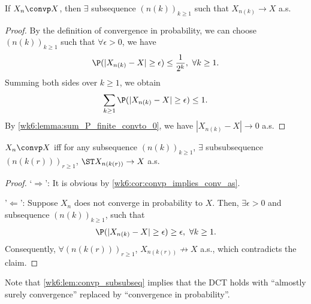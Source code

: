 \documentclass[../aipt.tex]{subfiles}
\begin{document}
%
\begin{Corollary} \label{wk6:cor:convp_implies_conv_as}
If $X_n \convp X$, then $\exists$ subsequence $(n(k))_{k\geq1}$ such that $X_{n(k)} \to X$ a.s.
\end{Corollary}
\begin{proof}
By the definition of convergence in probability, we can choose $(n(k))_{k\geq1}$ such that $\forall \epsilon > 0$, we have
\begin{align*}
\P(|X_{n(k)} - X| \geq \epsilon) \leq \frac{1}{2^k},\ \forall k \geq 1.
\end{align*}
Summing both sides over $k \geq 1$, we obtain
\begin{align*}
\sum_{k \geq 1} \P(|X_{n(k)} - X| \geq \epsilon) \leq 1.
\end{align*}
By \cref{wk6:lemma:sum_P_finite_convto_0}, we have $|X_{n(k)} - X| \to 0$ a.s.
\end{proof}
%
\begin{Lemma}\label{wk6:lem:convp_subsubseq}
$X_n \convp X$ iff for any subsequence $\left(n(k)\right)_{k \geq 1}$, $\exists$ subsubsequence $\left(n\left(k(r)\right)\right)_{r \geq 1}$, $\ST X_{n \left(k(r)\right)} \to X$ a.s.
\end{Lemma}
\begin{proof}
`$\Rightarrow$': It is obvious by \cref{wk6:cor:convp_implies_conv_as}. 

'$\Leftarrow$': Suppose $X_n$ does not converge in probability to $X$. Then, $\exists \epsilon > 0$ and subsequence $\left(n(k)\right)_{k \geq 1}$, such that
\begin{align*}
\P(|X_{n(k)} -X| \geq \epsilon) \geq \epsilon,\ \forall k \geq 1.
\end{align*}
Consequently, $\forall \left(n\left(k(r)\right)\right)_{r \geq 1}$, $X_{n \left(k(r)\right)} \not\to X$ a.s., which contradicts the claim.
\end{proof}
Note that \cref{wk6:lem:convp_subsubseq} implies that the DCT holds with ``almostly surely convergence'' replaced by ``convergence in probability''.
\end{document}
